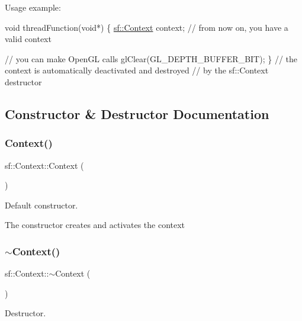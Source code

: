 Usage example\+: 
\begin{DoxyCode}
\textcolor{keywordtype}{void} threadFunction(\textcolor{keywordtype}{void}*)
\{
   \hyperlink{classsf_1_1_context}{sf::Context} context;
   \textcolor{comment}{// from now on, you have a valid context}

   \textcolor{comment}{// you can make OpenGL calls}
   glClear(GL\_DEPTH\_BUFFER\_BIT);
\}
\textcolor{comment}{// the context is automatically deactivated and destroyed}
\textcolor{comment}{// by the sf::Context destructor}
\end{DoxyCode}
 

\subsection{Constructor \& Destructor Documentation}
\mbox{\label{classsf_1_1_context_aba22797a790706ca2c5c04ee39f2b555}} 
\subsubsection{\texorpdfstring{Context()}{Context()}\hspace{0.1cm}{\footnotesize\ttfamily [1/2]}}
{\footnotesize\ttfamily sf\+::\+Context\+::\+Context (\begin{DoxyParamCaption}{ }\end{DoxyParamCaption})}



Default constructor. 

The constructor creates and activates the context \mbox{\label{classsf_1_1_context_a805b1bbdb3e52b1fda7c9bf2cd6ca86b}} 
\subsubsection{\texorpdfstring{$\sim$\+Context()}{~Context()}}
{\footnotesize\ttfamily sf\+::\+Context\+::$\sim$\+Context (\begin{DoxyParamCaption}{ }\end{DoxyParamCaption})}



Destructor. 

